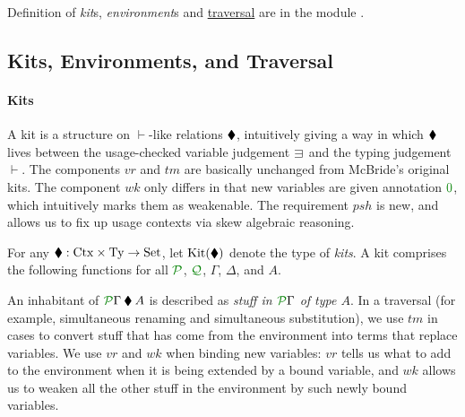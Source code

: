 \documentclass[submission,copyright,creativecommons]{eptcs}
\begin{document}
Definition of \emph{kit}s, \emph{environment}s and
\hyperref[thm:trav]{traversal} are in the module
.


\subsection{Kits, Environments, and Traversal}

\paragraph{Kits}
A kit is a structure on $\vdash$-like relations $\mathbin{\blacklozenge}$, intuitively
giving a way in which $\mathbin{\blacklozenge}$ lives between the usage-checked variable
judgement $\lvar$ and the typing judgement $\vdash$.
The components $\mathit{vr}$ and $\mathit{tm}$ are basically unchanged from
McBride's original kits.
The component $\mathit{wk}$ only differs in that new variables are given
annotation $\rescomment 0$, which intuitively marks them as weakenable.
The requirement $\mathit{psh}$ is new, and allows us to fix up usage contexts
via skew algebraic reasoning.

\begin{definition}\label{def:kit}
  For any $\mathbin{\blacklozenge} : \mathrm{Ctx} \times \mathrm{Ty} \to \mathrm{Set}$, let
  $\operatorname{Kit}(\mathbin{\blacklozenge})$ denote the type of \emph{kits}.
  A kit comprises the following functions for all $\resctx P$, $\resctx Q$,
  $\Gamma$, $\Delta$, and $A$.
\end{definition}

An inhabitant of $\ctx{\Gamma}{P} \kitrel A$ is described as
\emph{stuff in $\ctx{\Gamma}{P}$ of type $A$}.
In a traversal (for example, simultaneous renaming and simultaneous
substitution), we use $\mathit{tm}$ in  cases to convert stuff
that has come from the environment into terms that replace variables.
We use $\mathit{vr}$ and $\mathit{wk}$ when binding new variables: $\mathit{vr}$
tells us what to add to the environment when it is being extended by a bound
variable, and $\mathit{wk}$ allows us to weaken all the other stuff in the
environment by such newly bound variables.
\end{document}
